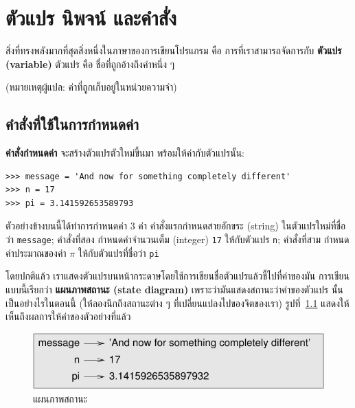 \chapter{ตัวแปร นิพจน์ และคำสั่ง} %

สิ่งที่ทรงพลังมากที่สุดสิ่งหนึ่งในภาษาของการเขียนโปรแกรม คือ การที่เราสามารถจัดการกับ {\bf ตัวแปร (variable)}  
ตัวแปร คือ ชื่อที่ถูกอ้างถึงค่าหนึ่ง ๆ 

(หมายเหตุผู้แปล: ค่าที่ถูกเก็บอยู่ในหน่วยความจำ) 


\section{คำสั่งที่ใช้ในการกำหนดค่า} %
\label{variables}

{\bf คำสั่งกำหนดค่า} จะสร้างตัวแปรตัวใหม่ขึ้นมา พร้อมให้ค่ากับตัวแปรนั้น:

\begin{verbatim}
>>> message = 'And now for something completely different'
>>> n = 17
>>> pi = 3.141592653589793
\end{verbatim}
%
ตัวอย่างข้างบนนี้ได้ทำการกำหนดค่า 3 ค่า คำสั่งแรกกำหนดสายอักขระ (string) ในตัวแปรใหม่ที่ชื่อว่า
\texttt{message};
คำสั่งที่สอง กำหนดค่าจำนวนเต็ม (integer) \texttt{17} ให้กับตัวแปร {\tt n};
คำสั่งที่สาม กำหนดค่าประมาณของค่า $\pi$ ให้กับตัวแปรที่ชื่อว่า {\tt pi}

โดยปกติแล้ว เราแสดงตัวแปรบนหน้ากระดาษโดยใช้การเขียนชื่อตัวแปรแล้วชี้ไปที่ค่าของมัน 
การเขียนแบบนี้เรียกว่า {\bf แผนภาพสถานะ (state diagram)} เพราะว่ามันแสดงสถานะว่าค่าของตัวแปร
นั้นเป็นอย่างไรในตอนนี้ (ให้ลองนึกถึงสถานะต่าง ๆ ที่เปลี่ยนแปลงไปของจิตของเรา) 
รูปที่~\ref{fig.state2} แสดงให้เห็นถึงผลการให้ค่าของตัวอย่างที่แล้ว

\begin{figure}
\centerline
{\includegraphics[scale=0.8]{figs/state2.pdf}}
\caption{แผนภาพสถานะ}
\label{fig.state2}
\end{figure}



